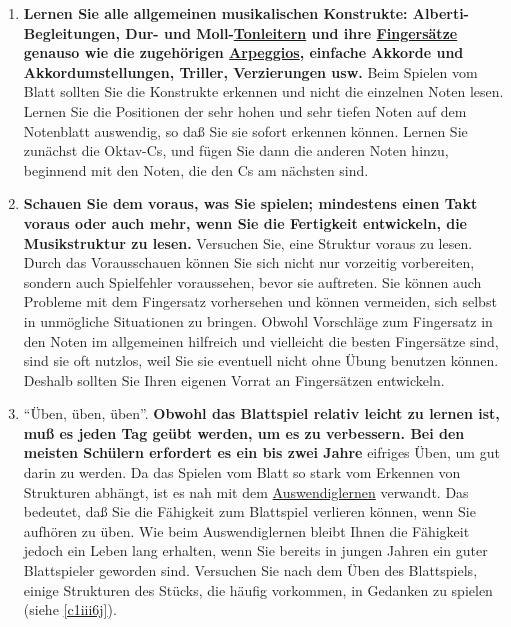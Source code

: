 \begin{enumerate}[label={\arabic*.}]
\item \textbf{Lernen Sie alle allgemeinen musikalischen Konstrukte: Alberti-Begleitungen, Dur- und Moll-\hyperref[c1iii5]{Tonleitern} und ihre \hyperref[table]{Fingersätze} genauso wie die zugehörigen \hyperref[Arpeggios]{Arpeggios}, einfache Akkorde und Akkordumstellungen, Triller, Verzierungen usw.}
Beim Spielen vom Blatt sollten Sie die Konstrukte erkennen und nicht die einzelnen Noten lesen.
Lernen Sie die Positionen der sehr hohen und sehr tiefen Noten auf dem Notenblatt auswendig, so daß Sie sie sofort erkennen können.
Lernen Sie zunächst die Oktav-Cs, und fügen Sie dann die anderen Noten hinzu, beginnend mit den Noten, die den Cs am nächsten sind.

\item \textbf{Schauen Sie dem voraus, was Sie spielen; mindestens einen Takt voraus oder auch mehr, wenn Sie die Fertigkeit entwickeln, die Musikstruktur zu lesen.}
Versuchen Sie, eine Struktur voraus zu lesen.
Durch das Vorausschauen können Sie sich nicht nur vorzeitig vorbereiten, sondern auch Spielfehler voraussehen, bevor sie auftreten.
Sie können auch Probleme mit dem Fingersatz vorhersehen und können vermeiden, sich selbst in unmögliche Situationen zu bringen.
Obwohl Vorschläge zum Fingersatz in den Noten im allgemeinen hilfreich und vielleicht die besten Fingersätze sind, sind sie oft nutzlos, weil Sie sie eventuell nicht ohne Übung benutzen können.
Deshalb sollten Sie Ihren eigenen Vorrat an Fingersätzen entwickeln.

\item \enquote{Üben, üben, üben}.
\textbf{Obwohl das Blattspiel relativ leicht zu lernen ist, muß es jeden Tag geübt werden, um es zu verbessern.
Bei den meisten Schülern erfordert es ein bis zwei Jahre} eifriges Üben, um gut darin zu werden.
Da das Spielen vom Blatt so stark vom Erkennen von Strukturen abhängt, ist es nah mit dem \hyperref[c1iii6]{Auswendiglernen} verwandt.
Das bedeutet, daß Sie die Fähigkeit zum Blattspiel verlieren können, wenn Sie aufhören zu üben.
Wie beim Auswendiglernen bleibt Ihnen die Fähigkeit jedoch ein Leben lang erhalten, wenn Sie bereits in jungen Jahren ein guter Blattspieler geworden sind.
Versuchen Sie nach dem Üben des Blattspiels, einige Strukturen des Stücks, die häufig vorkommen, in Gedanken zu spielen (siehe \hyperref[c1iii6j]{\autoref{c1iii6j}}).
\end{enumerate}

